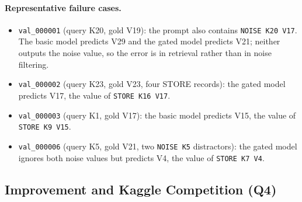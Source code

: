 \documentclass[11pt,a4paper]{article}
\begin{document}
\paragraph{Representative failure cases.}
\begin{itemize}
    \item \texttt{val\_000001} (query K20, gold V19): the prompt also
          contains \texttt{NOISE K20 V17}. The basic model predicts V29
          and the gated model predicts V21; neither outputs the noise
          value, so the error is in retrieval rather than in noise
          filtering.
    \item \texttt{val\_000002} (query K23, gold V23, four STORE
          records): the gated model predicts V17, the value of
          \texttt{STORE K16 V17}.
    \item \texttt{val\_000003} (query K1, gold V17): the basic model
          predicts V15, the value of \texttt{STORE K9 V15}.
    \item \texttt{val\_000006} (query K5, gold V21, two
          \texttt{NOISE K5} distractors): the gated model ignores both
          noise values but predicts V4, the value of \texttt{STORE K7 V4}.
\end{itemize}


\subsection{Improvement and Kaggle Competition (Q4)}
\end{document}
